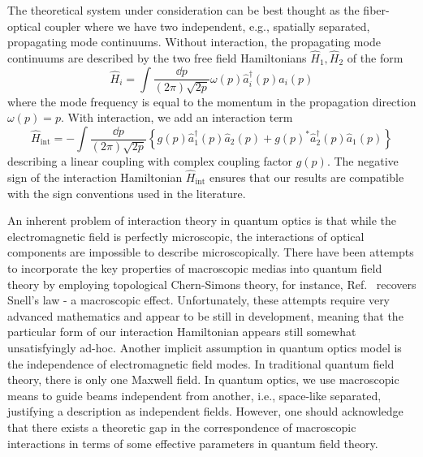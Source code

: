 The theoretical system under consideration can be best thought as the fiber-optical coupler where we have two independent, e.g., spatially separated, propagating mode continuums.
Without interaction, the propagating mode continuums are described by the two free field Hamiltonians $\hat{H}_1,\hat{H}_2$ of the form
\begin{equation}
	\hat{H}_i
	=
	\int\frac{\dd{p}}{(2\pi)\sqrt{2p}}
	\omega(p)
	\hat{a}_i^\dagger(p)
	\hat{a}_i(p)
\end{equation}
where the mode frequency is equal to the momentum in the propagation direction $\omega(p)=p$.
With interaction, we add an interaction term
\begin{equation}
	\hat{H}_\text{int}
	=
	-
	\int\frac{\dd{p}}{(2\pi)\sqrt{2p}}
	\left\{
		g(p)
		\hat{a}_1^\dagger(p)
		\hat{a}_2(p)
		+
		g(p)^*
		\hat{a}_2^\dagger(p)
		\hat{a}_1(p)
	\right\}
\end{equation}
describing a linear coupling with complex coupling factor $g(p)$.
The negative sign of the interaction Hamiltonian $\hat{H}_\text{int}$ ensures that our results are compatible with the sign conventions used in the literature.

An inherent problem of interaction theory in quantum optics is that while the electromagnetic field is perfectly microscopic, the interactions of optical components are impossible to describe microscopically.
There have been attempts to incorporate the key properties of macroscopic medias into quantum field theory by employing topological Chern-Simons theory, for instance, Ref.~\cite{Pismak2014} recovers Snell's law - a macroscopic effect.
Unfortunately, these attempts require very advanced mathematics and appear to be still in development, meaning that the particular form of our interaction Hamiltonian appears still somewhat unsatisfyingly ad-hoc.
Another implicit assumption in quantum optics model is the independence of electromagnetic field modes.
In traditional quantum field theory, there is only one Maxwell field.
In quantum optics, we use macroscopic means to guide beams independent from another, i.e., space-like separated, justifying a description as independent fields.
However, one should acknowledge that there exists a theoretic gap in the correspondence of macroscopic interactions in terms of some effective parameters in quantum field theory.

